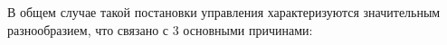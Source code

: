 \documentclass[preprint,russian,a5paper,10pt,twoside]{ncc}
\begin{document}

В общем случае такой постановки управления характеризуются значительным разнообразием, что связано с 3 основными причинами:
\end{document}
